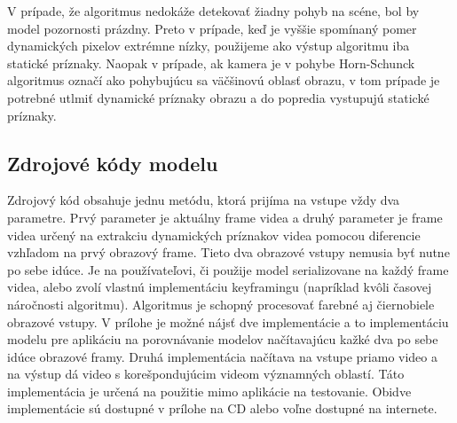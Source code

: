 V prípade, že algoritmus nedokáže detekovať žiadny pohyb na scéne, bol by model pozornosti prázdny.
Preto v prípade, keď je vyššie spomínaný pomer dynamických pixelov extrémne nízky, použijeme ako výstup algoritmu iba statické príznaky.
Naopak v prípade, ak kamera je v pohybe Horn-Schunck algoritmus označí ako pohybujúcu sa väčšinovú oblasť obrazu, v tom prípade je potrebné utlmiť dynamické príznaky obrazu a do popredia vystupujú statické príznaky.

\clearpage

\subsection{Zdrojové kódy modelu}
Zdrojový kód obsahuje jednu metódu, ktorá prijíma na vstupe vždy dva parametre.
Prvý parameter je aktuálny frame videa a druhý parameter je frame videa určený na extrakciu dynamických príznakov videa pomocou diferencie vzhľadom na prvý obrazový frame.
Tieto dva obrazové vstupy nemusia byť nutne po sebe idúce.
Je na používateľovi, či použije model serializovane na každý frame videa, alebo zvolí vlastnú implementáciu keyframingu (napríklad kvôli časovej náročnosti algoritmu).
Algoritmus je schopný procesovať farebné aj čiernobiele obrazové vstupy.
V prílohe je možné nájsť dve implementácie a to implementáciu modelu pre aplikáciu na porovnávanie modelov načítavajúcu kažké dva po sebe idúce obrazové framy.
Druhá implementácia načítava na vstupe priamo video a na výstup dá video s korešpondujúcim videom významných oblastí.
Táto implementácia je určená na použitie mimo aplikácie na testovanie.
Obidve implementácie sú dostupné v prílohe na CD alebo voľne dostupné na internete.

